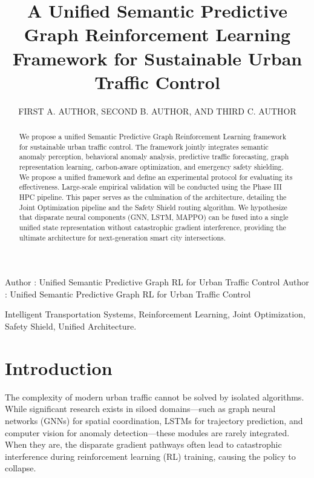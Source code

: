 \documentclass{ieeeaccess}
\begin{document}

\title{A Unified Semantic Predictive Graph Reinforcement Learning Framework for Sustainable Urban Traffic Control}
\author{\uppercase{First A. Author},
\uppercase{Second B. Author, and Third C. Author}}
\address[1]{Department of Computer Science, University of Technology, City, Country}

\markboth
{Author \headeretal: Unified Semantic Predictive Graph RL for Urban Traffic Control}
{Author \headeretal: Unified Semantic Predictive Graph RL for Urban Traffic Control}


\begin{abstract}
We propose a unified Semantic Predictive Graph Reinforcement Learning framework for sustainable urban traffic control. The framework jointly integrates semantic anomaly perception, behavioral anomaly analysis, predictive traffic forecasting, graph representation learning, carbon-aware optimization, and emergency safety shielding. We propose a unified framework and define an experimental protocol for evaluating its effectiveness. Large-scale empirical validation will be conducted using the Phase III HPC pipeline. This paper serves as the culmination of the architecture, detailing the Joint Optimization pipeline and the Safety Shield routing algorithm. We hypothesize that disparate neural components (GNN, LSTM, MAPPO) can be fused into a single unified state representation without catastrophic gradient interference, providing the ultimate architecture for next-generation smart city intersections.
\end{abstract}

\begin{keywords}
Intelligent Transportation Systems, Reinforcement Learning, Joint Optimization, Safety Shield, Unified Architecture.
\end{keywords}

\titlepgskip=-15pt
\maketitle

\section{Introduction}
\label{sec:introduction}
The complexity of modern urban traffic cannot be solved by isolated algorithms. While significant research exists in siloed domains—such as graph neural networks (GNNs) for spatial coordination, LSTMs for trajectory prediction, and computer vision for anomaly detection—these modules are rarely integrated. When they are, the disparate gradient pathways often lead to catastrophic interference during reinforcement learning (RL) training, causing the policy to collapse.
\end{document}
